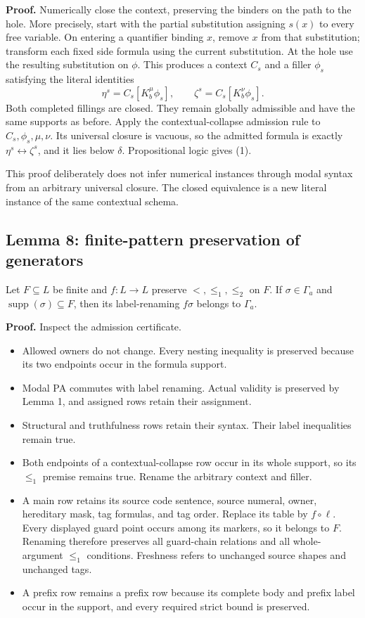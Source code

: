 \documentclass[
  11pt,
  letterpaper,
]{article}
\providecommand{\tightlist}{%
  \setlength{\itemsep}{0pt}\setlength{\parskip}{0pt}}
\begin{document}
\textbf{Proof.} Numerically close the context, preserving the binders on
the path to the hole. More precisely, start with the partial
substitution assigning \(s(x)\) to every free variable. On entering a
quantifier binding \(x\), remove \(x\) from that substitution; transform
each fixed side formula using the current substitution. At the hole use
the resulting substitution on \(\phi\). This produces a context \(C_s\)
and a filler \(\phi_s\) satisfying the literal identities \[
\eta^s=C_s[K_b^\mu\phi_s],\qquad
\zeta^s=C_s[K_b^\nu\phi_s].
\] Both completed fillings are closed. They remain globally admissible
and have the same supports as before. Apply the contextual-collapse
admission rule to \(C_s,\phi_s,\mu,\nu\). Its universal closure is
vacuous, so the admitted formula is exactly
\(\eta^s\leftrightarrow\zeta^s\), and it lies below \(\delta\).
Propositional logic gives (1).

This proof deliberately does not infer numerical instances through modal
syntax from an arbitrary universal closure. The closed equivalence is a
new literal instance of the same contextual schema.

\subsection{Lemma 8: finite-pattern preservation of
generators}\label{lemma-8-finite-pattern-preservation-of-generators}

Let \(F\subseteq L\) be finite and \(f:L\to L\) preserve
\(<,\leq_1,\leq_2\) on \(F\). If \(\sigma\in\Gamma_a\) and
\(\operatorname{supp}(\sigma)\subseteq F\), then its label-renaming
\(f\sigma\) belongs to \(\Gamma_a\).

\textbf{Proof.} Inspect the admission certificate.

\begin{itemize}
\tightlist
\item
  Allowed owners do not change. Every nesting inequality is preserved
  because its two endpoints occur in the formula support.
\item
  Modal PA commutes with label renaming. Actual validity is preserved by
  Lemma 1, and assigned rows retain their assignment.
\item
  Structural and truthfulness rows retain their syntax. Their label
  inequalities remain true.
\item
  Both endpoints of a contextual-collapse row occur in its whole
  support, so its \(\leq_1\) premise remains true. Rename the arbitrary
  context and filler.
\item
  A main row retains its source code sentence, source numeral, owner,
  hereditary mask, tag formulas, and tag order. Replace its table by
  \(f\circ\ell\). Every displayed guard point occurs among its markers,
  so it belongs to \(F\). Renaming therefore preserves all guard-chain
  relations and all whole-argument \(\leq_1\) conditions. Freshness
  refers to unchanged source shapes and unchanged tags.
\item
  A prefix row remains a prefix row because its complete body and prefix
  label occur in the support, and every required strict bound is
  preserved.
\end{itemize}
\end{document}
